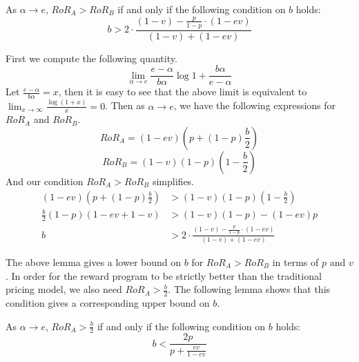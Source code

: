 \begin{lemma}
As $\alpha \rightarrow e$, $RoR_A > RoR_B$ if and only if the following condition on $b$ holds:
\begin{equation}
b > 2\cdot \frac{(1-v) - \frac{p}{1-p}\cdot (1-ev)}{(1-v) + (1-ev)}
\end{equation}
\end{lemma} 
\proof
First we compute the following quantity.
\begin{equation*}
\lim_{\alpha \to e} \frac{e-\alpha}{b\alpha}\log{1+\frac{b\alpha}{e-\alpha}}
\end{equation*}
Let $\frac{e-\alpha}{b\alpha} = x$, then it is easy to see that the above limit is equivalent to $\lim_{x\to \infty} \frac{\log(1+x)}{x} = 0$. Then as $\alpha \rightarrow e$, we have the following expressions for $RoR_A$ and $RoR_B$.
\begin{equation*}
RoR_A = (1-ev)\left(p+(1-p)\frac{b}{2} \right)
\end{equation*}
\begin{equation*}
RoR_B = (1-v)(1-p)\left(1-\frac{b}{2} \right)
\end{equation*}
And our condition $RoR_A > RoR_B$ simplifies.
\begin{align*}
(1-ev)\left(p+(1-p)\frac{b}{2} \right) &> (1-v)(1-p)\left(1-\frac{b}{2} \right) \\
\frac{b}{2}(1-p)(1-ev+1-v) &> (1-v)(1-p)-(1-ev)p \\
b &> 2\cdot \frac{(1-v) - \frac{p}{1-p}\cdot (1-ev)}{(1-v) + (1-ev)} 
\end{align*}

\endproof

The above lemma gives a lower bound on $b$ for $RoR_A > RoR_B$ in terms of $p$ and $v$. In order for the reward program to be strictly better than the traditional pricing model, we also need $RoR_A > \frac{b}{2}$. The following lemma shows that this condition gives a corresponding upper bound on $b$.

\begin{lemma}
As $\alpha \rightarrow e$, $RoR_A > \frac{b}{2}$ if and only if the following condition on $b$ holds:
\begin{equation}
b < \frac{2p}{p+\frac{ev}{1-ev}}
\end{equation}
\end{lemma} 

